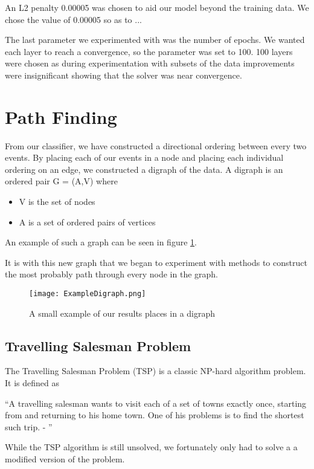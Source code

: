 \documentclass[bsc,frontabs,twoside,singlespacing,parskip,deptreport]{infthesis}     %
\begin{document}
 An L2 penalty 0.00005 was chosen to aid our model beyond the training data.
 We chose the value of 0.00005 so as to ...

 The last parameter we experimented with was the number of epochs.
 We wanted each layer to reach a convergence, so the parameter was set to 100.
 100 layers were chosen as during experimentation with subsets of the data improvements were
 insignificant showing that the solver was near convergence.

 \section{Path Finding} \label{chapter:graphing}
From our classifier, we have constructed a directional ordering between every two events.
By placing each of our events in a node and placing each individual ordering on an edge, we constructed
a digraph of the data.
A digraph is an ordered pair G = (A,V) where\cite{bang2008digraphs}
\begin{itemize}
  \item V is the set of nodes
  \item A is a set of ordered pairs of vertices
\end{itemize}
An example of such a graph can be seen in figure \ref{fig:digraph}.

It is with this new graph that we began to experiment with methods to construct the most probably path through every
node in the graph.


\begin{figure}
  \centering
  \texttt{[image: ExampleDigraph.png]}
  \caption{A small example of our results places in a digraph}
  \label{fig:digraph}
 \end{figure}

\subsection{Travelling Salesman Problem}
The Travelling Salesman Problem (TSP) is a classic NP-hard algorithm problem\cite{junger1995traveling}.%
It is defined as
\begin{center}
\enquote{A travelling salesman wants to visit each of a set of towns exactly once, starting
from and returning to his home town. One of his problems is to find the shortest
such trip. - \cite{junger1995traveling}}
\end{center}

While the TSP algorithm is still unsolved, we fortunately only had to solve a a modified version of the problem.\\
\end{document}

